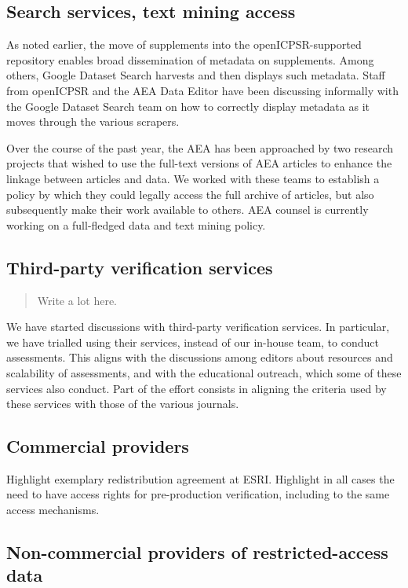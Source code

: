 \documentclass[PP]{AEA}
\begin{document}
\subsection{Search services, text mining access}
As noted earlier, the move of supplements into the openICPSR-supported repository enables broad dissemination of metadata on supplements. Among others, Google Dataset Search harvests and then displays such metadata. Staff from openICPSR and the AEA Data Editor have been discussing informally with the Google Dataset Search team on how to correctly display metadata as it moves through the various scrapers. 

Over the course of the past year, the AEA has been approached by two research projects that wished to use the full-text versions of AEA articles to enhance the linkage between articles and data. We worked with these teams to establish a policy by which they could legally access the full archive of articles, but also subsequently make their work available to others. AEA counsel is currently working on a full-fledged data and text mining policy.

\subsection{Third-party verification services}
\label{sec:3rdparty}

\begin{quote}
    Write a lot here.
\end{quote}
We have started discussions with third-party verification services. In particular, we have trialled using their services, instead of our in-house team, to conduct assessments. This aligns with the discussions among editors about resources and scalability of assessments, and with the educational outreach, which some of these services also conduct. Part of the effort consists in aligning the criteria used by these services with those of the various journals.

\subsection{Commercial providers}

Highlight exemplary redistribution agreement at ESRI. Highlight in all cases the need to have access rights for pre-production verification, including to the same access mechanisms. 

\subsection{Non-commercial providers of restricted-access data}
\end{document}
